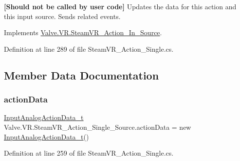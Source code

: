 {\bfseries{\mbox{[}Should not be called by user code\mbox{]}}} Updates the data for this action and this input source. Sends related events. 



Implements \mbox{\hyperlink{class_valve_1_1_v_r_1_1_steam_v_r___action___in___source_a800b521715c6cbfe32e9b0b6db7e0a16}{Valve.\+V\+R.\+Steam\+V\+R\+\_\+\+Action\+\_\+\+In\+\_\+\+Source}}.



Definition at line 289 of file Steam\+V\+R\+\_\+\+Action\+\_\+\+Single.\+cs.



\subsection{Member Data Documentation}
\mbox{\label{class_valve_1_1_v_r_1_1_steam_v_r___action___single___source_aacc98af87fc1a33c3e396299056b88f6}} 
\subsubsection{\texorpdfstring{actionData}{actionData}}
{\footnotesize\ttfamily \mbox{\hyperlink{struct_valve_1_1_v_r_1_1_input_analog_action_data__t}{Input\+Analog\+Action\+Data\+\_\+t}} Valve.\+V\+R.\+Steam\+V\+R\+\_\+\+Action\+\_\+\+Single\+\_\+\+Source.\+action\+Data = new \mbox{\hyperlink{struct_valve_1_1_v_r_1_1_input_analog_action_data__t}{Input\+Analog\+Action\+Data\+\_\+t}}()\hspace{0.3cm}{\ttfamily [protected]}}



Definition at line 259 of file Steam\+V\+R\+\_\+\+Action\+\_\+\+Single.\+cs.

\mbox{\label{class_valve_1_1_v_r_1_1_steam_v_r___action___single___source_afca656d11a1f6a78196292e8b1869837}} 
